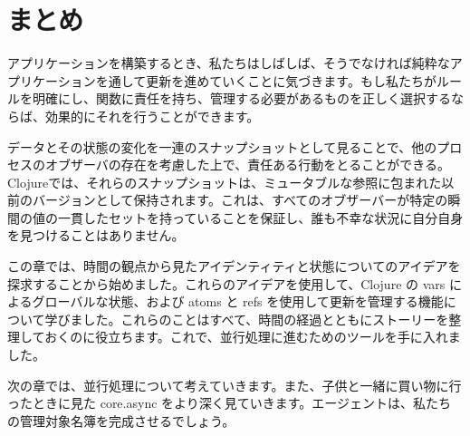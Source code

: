 \section{まとめ}

アプリケーションを構築するとき、私たちはしばしば、そうでなければ純粋なアプリケーションを通して更新を進めていくことに気づきます。もし私たちがルールを明確にし、関数に責任を持ち、管理する必要があるものを正しく選択するならば、効果的にそれを行うことができます。

データとその状態の変化を一連のスナップショットとして見ることで、他のプロセスのオブザーバの存在を考慮した上で、責任ある行動をとることができる。Clojureでは、それらのスナップショットは、ミュータブルな参照に包まれた以前のバージョンとして保持されます。これは、すべてのオブザーバーが特定の瞬間の値の一貫したセットを持っていることを保証し、誰も不幸な状況に自分自身を見つけることはありません。

この章では、時間の観点から見たアイデンティティと状態についてのアイデアを探求することから始めました。これらのアイデアを使用して、Clojure の vars によるグローバルな状態、および atoms と refs を使用して更新を管理する機能について学びました。これらのことはすべて、時間の経過とともにストーリーを整理しておくのに役立ちます。これで、並行処理に進むためのツールを手に入れました。

次の章では、並行処理について考えていきます。また、子供と一緒に買い物に行ったときに見た core.async をより深く見ていきます。エージェントは、私たちの管理対象名簿を完成させるでしょう。